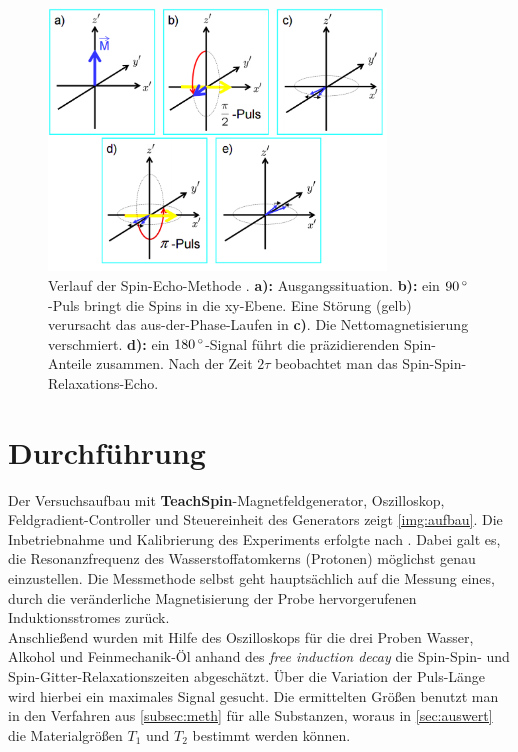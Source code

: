 \documentclass[numbers=noenddot,a4paper,notitlepage,twoside,BCOR15mm]{scrartcl}
\newcommand{\degree}{^\circ}
\newcommand{\ix}[1]{_\text{#1}}
\newcommand{\tilt}[1]{\textit{#1}}
\newcommand{\fett}[1]{\textbf{#1}}
\begin{document}
					\begin{figure}[h]
						\centering
						\includegraphics[width=0.8\textwidth]{umklappen.png}
						\caption{Verlauf der Spin-Echo-Methode . \fett{a):} Ausgangssituation. \fett{b):} ein $\unit[90]{\degree}$-Puls bringt die Spins in die xy-Ebene. Eine Störung (gelb) verursacht das aus-der-Phase-Laufen in \fett{c)}. Die Nettomagnetisierung verschmiert. \fett{d):} ein $\unit[180]{\degree}$-Signal führt die präzidierenden Spin-Anteile zusammen. Nach der Zeit $2\tau$ beobachtet man das Spin-Spin-Relaxations-Echo.\cite{UAchenNMR}}
						\label{img:umklappen}
					\end{figure}

	\clearpage
	\section{Durchführung}

		Der Versuchsaufbau mit \fett{TeachSpin}-Magnetfeldgenerator, Oszilloskop, Feldgradient-Controller und Steuereinheit des Generators zeigt \autoref{img:aufbau}. Die Inbetriebnahme und Kalibrierung des Experiments erfolgte nach \cite{EMAUGreifswaldNMR}. Dabei galt es, die Resonanzfrequenz des Wasserstoffatomkerns (Protonen) möglichst genau einzustellen. Die Messmethode selbst geht hauptsächlich auf die Messung eines, durch die veränderliche Magnetisierung der Probe hervorgerufenen Induktionsstromes zurück. \\
		Anschließend wurden mit Hilfe des Oszilloskops für die drei Proben Wasser, Alkohol und Feinmechanik-Öl anhand des \tilt{free induction decay} die Spin-Spin- und Spin-Gitter-Relaxationszeiten abgeschätzt. Über die Variation der Puls-Länge wird hierbei ein maximales Signal gesucht. Die ermittelten Größen benutzt man in den Verfahren aus \autoref{subsec:meth} für alle Substanzen, woraus in \autoref{sec:auswert} die Materialgrößen $T\ix{1}$ und $T\ix{2}$ bestimmt werden können.
\end{document}
